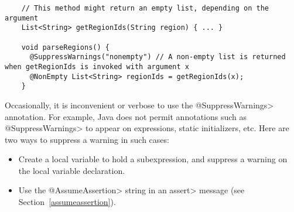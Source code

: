 \begin{Verbatim}
    // This method might return an empty list, depending on the argument
    List<String> getRegionIds(String region) { ... }

    void parseRegions() {
      @SuppressWarnings("nonempty") // A non-empty list is returned when getRegionIds is invoked with argument x
      @NonEmpty List<String> regionIds = getRegionIds(x);
    }
\end{Verbatim}


Occasionally, it is inconvenient or verbose to use the \<@SuppressWarnings>
annotation.
For example, Java does not permit annotations such as \<@SuppressWarnings> to
appear on expressions, static initializers, etc.
Here are two ways to suppress a warning in such cases:

\begin{itemize}
\item
  Create a local variable to hold a subexpression, and
  suppress a warning on the local variable declaration.
\item
  Use the \<@AssumeAssertion> string in
  an \<assert> message (see Section~\ref{assumeassertion}).
\end{itemize}

